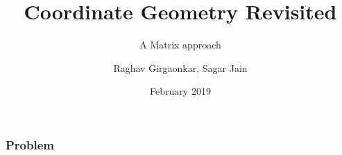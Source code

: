 \documentclass{beamer}
\title{Coordinate Geometry Revisited}
\subtitle{A Matrix approach}
\author{Raghav Girgaonkar, Sagar Jain}
\institute{Indian Institute of Technology Hyderabad}
\date{February 2019}
\begin{document}
 
\frame{\titlepage}
 
\begin{frame}
\frametitle{Problem}

\end{frame}
 
\end{document}
